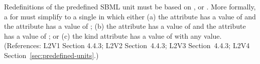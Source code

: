 Redefinitions of the predefined SBML unit  must be
based on ,  or .  More
formally, a \UnitDefinition for  must simplify to a single
\Unit in which either (a) the  attribute has
a value of  and the  attribute has a value of
; (b) the  attribute has a value of
 and the  attribute has a value of ; or
(c) the kind attribute has a value of  with
any  value.  (References: L2V1 Section 4.4.3; L2V2
Section~4.4.3; L2V3 Section~4.4.3; L2V4
Section~\ref{sec:predefined-units}.)
